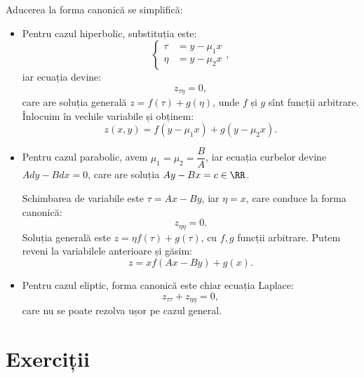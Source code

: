 Aducerea la forma canonică se simplifică:
\begin{itemize}
    \item Pentru cazul hiperbolic, substituția este:
        \[
            \begin{cases}
                \tau &= y - \mu_1 x \\
                \eta &= y - \mu_2 x
            \end{cases},
        \]
        iar ecuația devine:
        \[
            z_{\tau\eta} = 0,
        \]
        care are soluția generală $ z = f(\tau) + g(\eta) $, unde $ f $ și $ g $ sînt
        funcții arbitrare. Înlocuim în vechile variabile și obținem:
        \[
            z(x, y) = f(y - \mu_1 x) + g(y - \mu_2 x).
        \]
    \item Pentru cazul parabolic, avem $ \mu_1 = \mu_2 = \dfrac{B}{A} $, iar ecuația
        curbelor devine $ Ady - Bdx = 0 $, care are soluția $ Ay - Bx = c \in \RR $.

        Schimbarea de variabile este $ \tau = Ax - By $, iar $ \eta = x $, care conduce
        la forma canonică:
        \[
            z_{\eta\eta} = 0.
        \]
        Soluția generală este $ z = \eta f(\tau) + g(\tau) $, cu $ f, g $ funcții arbitrare.
        Putem reveni la variabilele anterioare și găsim:
        \[
            z = x f(Ax - By) + g(x).
        \]
    \item Pentru cazul eliptic, forma canonică este chiar ecuația Laplace:
        \[
            z_{\tau\tau} + z_{\eta\eta} = 0,
        \]
        care nu se poate rezolva ușor pe cazul general.
\end{itemize}

\section{Exerciții}

